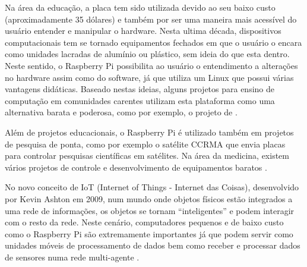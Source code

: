 Na área da educação, a placa tem sido utilizada devido ao seu baixo custo (aproximadamente 35 dólares) e também por ser uma maneira mais acessível do usuário entender e manipular o hardware. Nesta ultima década, dispositivos computacionais tem se tornado equipamentos fechados em que o usuário o encara como unidades lacradas de alumínio ou plástico, sem ideia do que esta dentro. Neste sentido, o Raspberry Pi possibilita ao usuário o entendimento a alterações no hardware assim como do software, já que utiliza um Linux que possui várias vantagens didáticas. Baseado nestas ideias, alguns projetos para ensino de computação em comunidades carentes utilizam esta plataforma como uma alternativa barata e poderosa, como por exemplo, o projeto de \citet{raspberry-data}.

Além de projetos educacionais, o Raspberry Pi é utilizado também em projetos de pesquisa de ponta, como por exemplo o satélite CCRMA \citep{raspberry-embedded} que envia placas para controlar pesquisas científicas em satélites. Na área da medicina, existem vários projetos de controle e desenvolvimento de equipamentos baratos \citet{raspberry-pesquisa}.

No novo conceito de IoT (Internet of Things - Internet das Coisas), desenvolvido por Kevin Ashton em 2009, num mundo onde objetos físicos estão integrados a uma rede de informações, os objetos se tornam “inteligentes” e podem interagir com o resto da rede. Neste cenário, computadores pequenos e de baixo custo como o Raspberry Pi são extremamente importantes já que podem servir como unidades móveis de processamento de dados \citep{raspberry-pesquisa} bem como receber e processar dados de sensores numa rede multi-agente \citep{raspberry-data}.









































